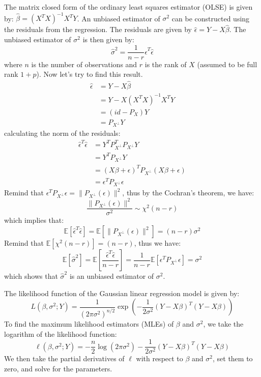 \begin{answerenum}
    \item The matrix closed form of the ordinary least squares estimator (OLSE) is given by: \( \hat{\beta} = (X^T X)^{-1} X^T Y \). An unbiased estimator of \(\sigma^2\) can be constructed using the residuals from the regression. The residuals are given by \( \hat{\epsilon} = Y - X\hat{\beta} \). The unbiased estimator of \(\sigma^2\) is then given by:
        \[ \hat{\sigma}^2 = \frac{1}{n - r} \hat{\epsilon}^T \hat{\epsilon} \]
        where \(n\) is the number of observations and \(r\) is the rank of \(X\) (assumed to be full rank \(1+p\)).
        Now let's try to find this result. 
        \begin{align*}
            \hat{\epsilon} &= Y - X\hat{\beta} \\
            &= Y - X(X^T X)^{-1} X^T Y \\
            &= (id - P_X)Y \\
            &= P_{X^\perp} Y
        \end{align*}
        calculating the norm of the residuals:
        \begin{align*}
            \hat{\epsilon}^T \hat{\epsilon} &= Y^T P_{X^\perp}^T P_{X^\perp} Y \\
            &= Y^T P_{X^\perp} Y \\
            &= (X\beta + \epsilon)^T P_{X^\perp} (X\beta + \epsilon) \\
            &= \epsilon^T P_{X^\perp} \epsilon
        \end{align*}
        Remind that \(\epsilon^T P_{X^\perp} \epsilon = \| P_{X^\perp}(\epsilon) \|^2 \), thus by the Cochran's theorem, we have:
        \[ \frac{\| P_{X^\perp}(\epsilon) \|^2}{\sigma^2} \sim \chi^2(n - r) \]
        which implies that:
        \[ \mathbb{E}[\hat{\epsilon}^T \hat{\epsilon}] = \mathbb{E}[\| P_{X^\perp}(\epsilon) \|^2] = (n - r) \sigma^2 \]
        Remind that \(\mathbb{E}[\chi^2(n - r)] = (n - r)\), thus we have:
        \[ \mathbb{E}[\hat{\sigma}^2] = \mathbb{E}\left[\frac{\hat{\epsilon}^T \hat{\epsilon}}{n - r}\right] = \frac{1}{n - r} \mathbb{E}[\epsilon^T P_{X^\perp} \epsilon] = \sigma^2 \]
        which shows that \(\hat{\sigma}^2\) is an unbiased estimator of \(\sigma^2\).
    \item The likelihood function of the Gaussian linear regression model is given by:
        \[ L(\beta, \sigma^2; Y) = \frac{1}{(2\pi \sigma^2)^{n/2}} \exp\left(-\frac{1}{2\sigma^2} (Y - X\beta)^T (Y - X\beta)\right) \]
        To find the maximum likelihood estimators (MLEs) of \(\beta\) and \(\sigma^2\), we take the logarithm of the likelihood function:
        \[ \ell(\beta, \sigma^2; Y) = -\frac{n}{2} \log(2\pi \sigma^2) - \frac{1}{2\sigma^2} (Y - X\beta)^T (Y - X\beta) \]
        We then take the partial derivatives of \(\ell\) with respect to \(\beta\) and \(\sigma^2\), set them to zero, and solve for the parameters.
\end{answerenum}